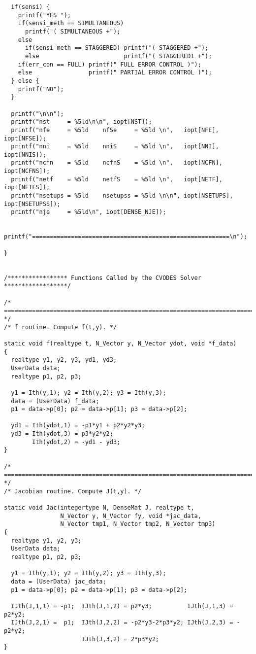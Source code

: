 \begin{verbatim}
  if(sensi) {
    printf("YES ");
    if(sensi_meth == SIMULTANEOUS)   
      printf("( SIMULTANEOUS +");
    else 
      if(sensi_meth == STAGGERED) printf("( STAGGERED +");
      else                        printf("( STAGGERED1 +");   
    if(err_con == FULL) printf(" FULL ERROR CONTROL )");
    else                printf(" PARTIAL ERROR CONTROL )");
  } else {
    printf("NO");
  }

  printf("\n\n");
  printf("nst     = %5ld\n\n", iopt[NST]);
  printf("nfe     = %5ld    nfSe     = %5ld \n",   iopt[NFE],     iopt[NFSE]);
  printf("nni     = %5ld    nniS     = %5ld \n",   iopt[NNI],     iopt[NNIS]);
  printf("ncfn    = %5ld    ncfnS    = %5ld \n",   iopt[NCFN],    iopt[NCFNS]);
  printf("netf    = %5ld    netfS    = %5ld \n",   iopt[NETF],    iopt[NETFS]);
  printf("nsetups = %5ld    nsetupss = %5ld \n\n", iopt[NSETUPS], iopt[NSETUPSS]);
  printf("nje     = %5ld\n", iopt[DENSE_NJE]);

  printf("========================================================\n");

}


/***************** Functions Called by the CVODES Solver ******************/

/* ======================================================================= */
/* f routine. Compute f(t,y). */

static void f(realtype t, N_Vector y, N_Vector ydot, void *f_data)
{
  realtype y1, y2, y3, yd1, yd3;
  UserData data;
  realtype p1, p2, p3;

  y1 = Ith(y,1); y2 = Ith(y,2); y3 = Ith(y,3);
  data = (UserData) f_data;
  p1 = data->p[0]; p2 = data->p[1]; p3 = data->p[2];

  yd1 = Ith(ydot,1) = -p1*y1 + p2*y2*y3;
  yd3 = Ith(ydot,3) = p3*y2*y2;
        Ith(ydot,2) = -yd1 - yd3;
}

/* ======================================================================= */
/* Jacobian routine. Compute J(t,y). */

static void Jac(integertype N, DenseMat J, realtype t,
                N_Vector y, N_Vector fy, void *jac_data, 
                N_Vector tmp1, N_Vector tmp2, N_Vector tmp3)
{
  realtype y1, y2, y3;
  UserData data;
  realtype p1, p2, p3;
 
  y1 = Ith(y,1); y2 = Ith(y,2); y3 = Ith(y,3);
  data = (UserData) jac_data;
  p1 = data->p[0]; p2 = data->p[1]; p3 = data->p[2];
 
  IJth(J,1,1) = -p1;  IJth(J,1,2) = p2*y3;          IJth(J,1,3) = p2*y2;
  IJth(J,2,1) =  p1;  IJth(J,2,2) = -p2*y3-2*p3*y2; IJth(J,2,3) = -p2*y2;
                      IJth(J,3,2) = 2*p3*y2;
}
 

\end{verbatim}
